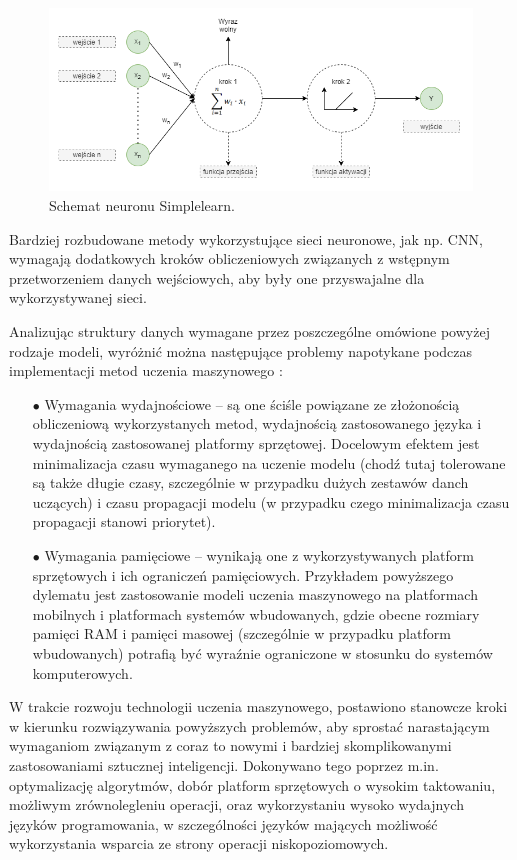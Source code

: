 \begin{figure}[!ht]
    \centering
    \includegraphics[width=150mm]{Rysunki/Rozdzial2/neuron.png}
    \caption{Schemat neuronu \dywiz{} Simplelearn.}
    \label{fig:nn}
\end{figure}

Bardziej rozbudowane metody wykorzystujące sieci neuronowe, jak np. CNN, wymagają dodatkowych kroków obliczeniowych związanych z wstępnym przetworzeniem danych wejściowych, aby były one przyswajalne dla wykorzystywanej sieci.

Analizując struktury danych wymagane przez poszczególne omówione powyżej rodzaje modeli, wyróżnić można następujące problemy napotykane podczas implementacji metod uczenia maszynowego \cite{constrained}:

\begin{itemize}
    \item [$\bullet$] Wymagania wydajnościowe -- są one ściśle powiązane ze złożonością obliczeniową wykorzystanych metod, wydajnością zastosowanego języka i wydajnością zastosowanej platformy sprzętowej. Docelowym efektem jest minimalizacja czasu wymaganego na uczenie modelu (chodź tutaj tolerowane są także długie czasy, szczególnie w przypadku dużych zestawów danch uczących) i czasu propagacji modelu (w przypadku czego minimalizacja czasu propagacji stanowi priorytet).
    
    \item [$\bullet$] Wymagania pamięciowe -- wynikają one z wykorzystywanych platform sprzętowych i ich ograniczeń pamięciowych. Przykładem powyższego dylematu jest zastosowanie modeli uczenia maszynowego na platformach mobilnych i platformach systemów wbudowanych, gdzie obecne rozmiary pamięci RAM i pamięci masowej (szczególnie w przypadku platform wbudowanych) potrafią być wyraźnie ograniczone w stosunku do systemów komputerowych.
\end{itemize}

W trakcie rozwoju technologii uczenia maszynowego, postawiono stanowcze kroki w kierunku rozwiązywania powyższych problemów, aby sprostać narastającym wymaganiom związanym z coraz to nowymi i bardziej skomplikowanymi zastosowaniami sztucznej inteligencji. Dokonywano tego poprzez m.in. optymalizację algorytmów, dobór platform sprzętowych o wysokim taktowaniu, możliwym zrównolegleniu operacji, oraz wykorzystaniu wysoko wydajnych języków programowania, w szczególności języków mających możliwość wykorzystania wsparcia ze strony operacji niskopoziomowych.

